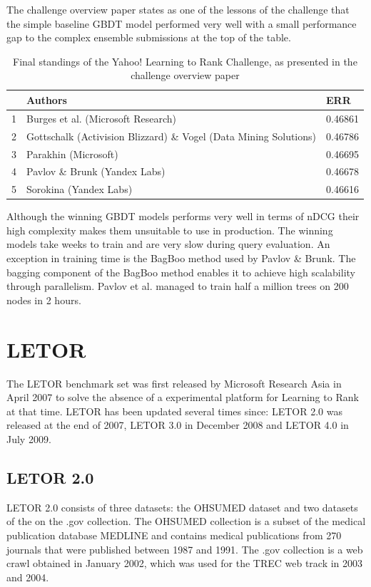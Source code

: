 The challenge overview paper \cite{Chapelle2011a} states as one of the lessons of the challenge that the simple baseline \ac{GBDT} model performed very well with a small performance gap to the complex ensemble submissions at the top of the table.\\

\begin{table}
\begin{tabular}{l|p{6.3cm}|l}
 & Authors & ERR \\
 \hline 
1 & Burges et al. (Microsoft Research) & 0.46861 \\ 
2 & Gottschalk (Activision Blizzard) \& Vogel (Data Mining Solutions) & 0.46786 \\ 
3 & Parakhin (Microsoft) & 0.46695 \\ 
4 & Pavlov \& Brunk (Yandex Labs) & 0.46678 \\ 
5 & Sorokina (Yandex Labs) & 0.46616 \\ 
\end{tabular}
\caption{Final standings of the Yahoo! Learning to Rank Challenge, as presented in the challenge overview paper \cite{Chapelle2011a}}
\label{fig:yahoo_results}
\end{table}

Although the winning \ac{GBDT} models performs very well in terms of \ac{nDCG} their high complexity makes them unsuitable to use in production. The winning models take weeks to train and are very slow during query evaluation. An exception in training time is the BagBoo \cite{Pavlov2010} method used by Pavlov \& Brunk. The bagging component of the BagBoo method enables it to achieve high scalability through parallelism. Pavlov et al. \cite{Pavlov2010} managed to train half a million trees on 200 nodes in 2 hours.

\section{LETOR}
The LETOR benchmark set was first released by Microsoft Research Asia in April 2007 \cite{Liu2007b} to solve the absence of a experimental platform for Learning to Rank at that time. LETOR has been updated several times since: LETOR 2.0 was released at the end of 2007, LETOR 3.0 \cite{Qin2010} in December 2008 and LETOR 4.0 \cite{Qin2013} in July 2009.

\subsection{LETOR 2.0}
LETOR 2.0 consists of three datasets: the OHSUMED dataset and two datasets of the on the .gov collection. The OHSUMED collection is a subset of the medical publication database MEDLINE and contains medical publications from 270 journals that were published between 1987 and 1991. The .gov collection is a web crawl obtained in January 2002, which was used for the \ac{TREC} web track in 2003 and 2004.\\

